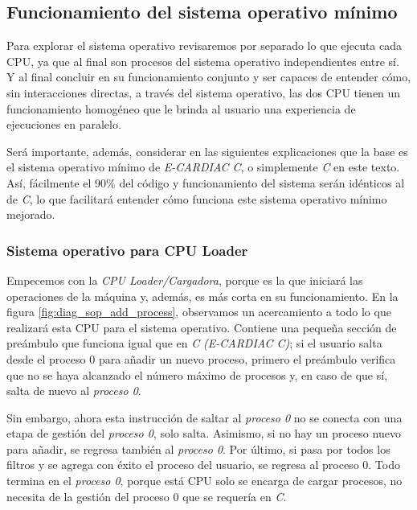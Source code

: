 \documentclass[letterpaper,12pt,oneside]{book}
\begin{document}
	 	\subsection{Funcionamiento del sistema operativo mínimo}
			
			Para explorar el sistema operativo revisaremos por separado lo que ejecuta cada CPU, ya que al final son procesos
			del sistema operativo independientes entre sí. Y al final concluir en su funcionamiento conjunto y ser capaces
			de entender cómo, sin interacciones directas, a través del sistema operativo, las dos CPU tienen un funcionamiento homogéneo 
			que le brinda al usuario una experiencia de ejecuciones en paralelo.
			
			Será importante, además, considerar en las siguientes explicaciones que la base es el sistema operativo mínimo 
			de \textit{E-CARDIAC C}, o simplemente \textit{C} en este texto. 
			Así, fácilmente el 90\% del código y funcionamiento del sistema serán idénticos al de  \textit{C}, lo que facilitará entender cómo 
			funciona este
			sistema operativo mínimo mejorado.

	 	
		 	\subsubsection{ Sistema operativo para CPU Loader }
		 	
		 		Empecemos con la \textit{CPU Loader/Cargadora}, porque es la que iniciará las operaciones de la máquina y, además, es más corta en su 
		 		funcionamiento. En
		 		la figura \ref{fig:diag_sop_add_process}, observamos un acercamiento a todo lo que realizará esta CPU para el sistema operativo. 
		 		Contiene 
		 		una pequeña
		 		sección de preámbulo que funciona igual que en \textit{C} \textit{(E-CARDIAC C)};
		 		si el usuario salta desde el proceso 0 para añadir un nuevo proceso, primero el preámbulo verifica que no se haya alcanzado el número 
		 		máximo de procesos y, en caso de que sí, salta de nuevo al \textit{proceso 0}. 
		 		
		 		Sin embargo, ahora esta
		 		instrucción de saltar al \textit{proceso 0} 
		 		no se conecta con una etapa de gestión del \textit{proceso 0}, solo salta. Asimismo, si no hay 
		 		un proceso nuevo para añadir, se regresa también al \textit{proceso 0}.
		 		 Por último, si pasa por todos los filtros y se agrega con éxito el proceso del usuario, se regresa al proceso 0. Todo 
		 		termina
		 		en el \textit{proceso 0}, porque está CPU solo se encarga de cargar procesos, no necesita de la
		 		gestión del proceso 0 que se requería en \textit{C}. 
     
\end{document}
